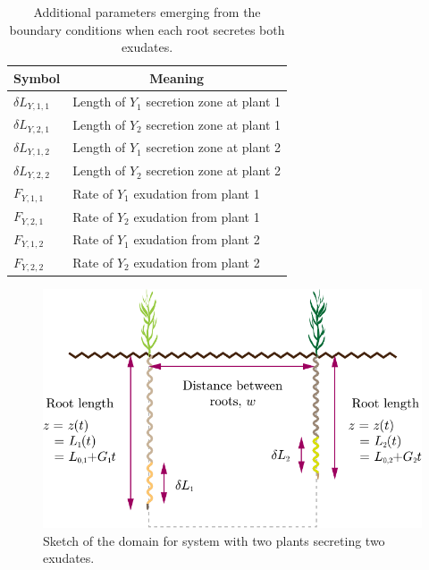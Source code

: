 \documentclass[11pt]{article}
\numberwithin{equation}{section}
\begin{document}
	
\begin{table}[!htb]
\begin{center}
\fontsize{9.5}{7}\selectfont
\setlength{\tabcolsep}{5.pt}
\def\arraystretch{1.5}
\begin{tabular}{ll}
\toprule
    \bf Symbol & \multicolumn{1}{c}{\bf Meaning}
    \\ \midrule
	$\delta L_{Y,1,1}$ & Length of $Y_1$ secretion zone at plant 1  \\
	$\delta L_{Y,2,1}$ & Length of $Y_2$ secretion zone at plant 1  \\
	$\delta L_{Y,1,2}$ &  Length of $Y_1$ secretion zone at plant 2 \\
	$\delta L_{Y,2,2}$ &  Length of $Y_2$ secretion zone at plant 2 \\
    $F_{Y,1,1} $ & Rate of $Y_1$ exudation from plant 1 \\
	$F_{Y,2,1} $ & Rate of $Y_2$ exudation from plant 1 \\
	$F_{Y,1,2} $ & Rate of $Y_1$ exudation from plant 2 \\
	$F_{Y,2,2} $ & Rate of $Y_2$ exudation from plant 2 \\
\bottomrule
\end{tabular}
\caption{Additional parameters emerging from the boundary conditions when each root secretes both exudates.
\label{t:Boundary-additional-parameters}}
\end{center}
\end{table}

\begin{figure}[!htb]
    \centering
    \includegraphics[scale=0.7]{Figures/Third-plot.pdf}
    \caption{Sketch of the domain for system with two plants secreting two exudates.}
    \label{fig:2roots-b}
\end{figure}
\end{document}
